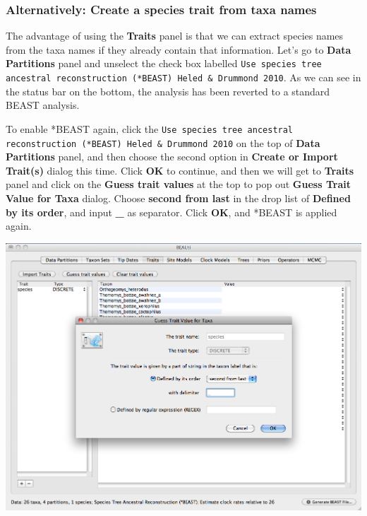 \documentclass[12pt]{article}
\begin{document}
\medskip{}


\subsubsection*{Alternatively: Create a species trait from taxa names}

The advantage of using the {\bf Traits} panel is that we can extract species names from the taxa names if they already contain that information. Let's go to {\bf Data Partitions} panel and unselect the check box labelled \texttt{Use species tree ancestral reconstruction (*BEAST) Heled \& Drummond 2010}. As we can see in the status bar on the bottom, the analysis has been reverted to a standard BEAST analysis.

To enable *BEAST again, click the \texttt{Use species tree ancestral reconstruction (*BEAST) Heled \& Drummond 2010} on the top of {\bf Data Partitions} panel, and then choose the second option in {\bf Create or Import Trait(s)} dialog this time. Click \textbf{OK} to continue, and then we will get to {\bf Traits} panel and click on the \textbf{Guess trait values} at the top to pop out {\bf Guess Trait Value for Taxa} dialog. Choose \textbf{second from last} in the drop list of \textbf{Defined by its order}, and input \textbf{\_} as separator. Click \textbf{OK}, and *BEAST is applied again.

\medskip{}

\includegraphics[scale=0.4]{figures/BEAUti_GuessTrait}

\medskip{}

\medskip{}
\end{document}
